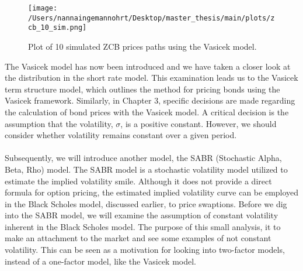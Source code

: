 \noindent
\begin{figure}[H]
    \centering
    \texttt{[image: /Users/nannaingemannohrt/Desktop/master\_thesis/main/plots/zcb\_10\_sim.png]}
    \caption{Plot of 10 simulated  ZCB prices  paths using the Vasicek model.}
    \label{fig:zcb_sim_10_plot}
\end{figure}
\noindent
The Vasicek model has now been introduced and we have taken a closer look at the distribution in the short rate model. 
This examination leads us to the Vasicek term structure model, which outlines the method for pricing bonds using the 
Vasicek framework. Similarly, in Chapter 3, specific decisions are made regarding the calculation of bond prices with 
the Vasicek model. A critical decision is the assumption that the volatility, 
$\sigma$, is a positive constant. However, we should consider whether volatility remains constant over a given period.
\\\\
Subsequently, we will introduce another model, the SABR (Stochastic Alpha, Beta, Rho) model. The SABR model is a stochastic volatility model 
utilized to estimate the implied volatility smile. Although it does not provide a direct formula for option pricing, 
the estimated implied volatility curve can be employed in the Black Scholes model, discussed earlier, to price swaptions. 
Before we dig into the SABR model, we will examine the assumption of constant volatility inherent in the Black Scholes model.
The purpose of this small analysis, it to make an attachment to the
market and see some examples of not constant volatility. This can 
be seen as a motivation for looking into two-factor models, 
instead of a one-factor model, like the Vasicek model. 
